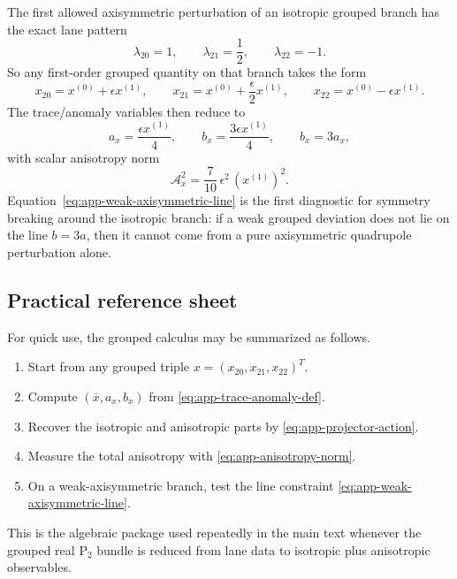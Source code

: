 \documentclass[11pt]{article}
\theoremstyle{definition}
\newcommand{\Ptwo}{\ensuremath{\mathrm{P}_2}}
\begin{document}
The first allowed axisymmetric perturbation of an isotropic grouped branch has the exact lane pattern
\begin{equation}
 \lambda_{20}=1,
 \qquad
 \lambda_{21}=\frac12,
 \qquad
 \lambda_{22}=-1.
 \label{eq:app-weak-axisymmetric-lambda}
\end{equation}
So any first-order grouped quantity on that branch takes the form
\begin{equation}
 x_{20}=x^{(0)}+\epsilon x^{(1)},
 \qquad
 x_{21}=x^{(0)}+\frac{\epsilon}{2}x^{(1)},
 \qquad
 x_{22}=x^{(0)}-\epsilon x^{(1)}.
 \label{eq:app-weak-axisymmetric-form}
\end{equation}
The trace/anomaly variables then reduce to
\begin{equation}
 a_x=\frac{\epsilon x^{(1)}}{4},
 \qquad
 b_x=\frac{3\epsilon x^{(1)}}{4},
 \qquad
 b_x=3a_x,
 \label{eq:app-weak-axisymmetric-line}
\end{equation}
with scalar anisotropy norm
\begin{equation}
 \mathcal A_x^2=\frac{7}{10}\,\epsilon^2\,(x^{(1)})^2.
 \label{eq:app-weak-axisymmetric-norm}
\end{equation}
Equation~\eqref{eq:app-weak-axisymmetric-line} is the first diagnostic for symmetry breaking around the isotropic branch: if a weak grouped deviation does not lie on the line $b=3a$, then it cannot come from a pure axisymmetric quadrupole perturbation alone.

\subsection{Practical reference sheet}

For quick use, the grouped calculus may be summarized as follows.
\begin{enumerate}
    \item Start from any grouped triple $x=(x_{20},x_{21},x_{22})^T$.
    \item Compute $(\bar x,a_x,b_x)$ from \eqref{eq:app-trace-anomaly-def}.
    \item Recover the isotropic and anisotropic parts by \eqref{eq:app-projector-action}.
    \item Measure the total anisotropy with \eqref{eq:app-anisotropy-norm}.
    \item On a weak-axisymmetric branch, test the line constraint \eqref{eq:app-weak-axisymmetric-line}.
\end{enumerate}
This is the algebraic package used repeatedly in the main text whenever the grouped real $\Ptwo$ bundle is reduced from lane data to isotropic plus anisotropic observables.
\end{document}
